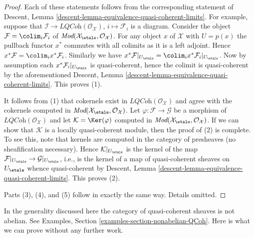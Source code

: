 \begin{proof}
Each of these statements follows from the corresponding statement of
Descent, Lemma \ref{descent-lemma-equivalence-quasi-coherent-limits}.
For example, suppose that
$\mathcal{I} \to \textit{LQCoh}(\mathcal{O}_\mathcal{X})$,
$i \mapsto \mathcal{F}_i$ is a diagram.
Consider the object $\mathcal{F} = \colim_i \mathcal{F}_i$ of
$\textit{Mod}(\mathcal{X}_\etale, \mathcal{O}_\mathcal{X})$.
For any object $x$ of $\mathcal{X}$ with $U = p(x)$ the pullback functor
$x^*$ commutes with all colimits as it is a left adjoint. Hence
$x^*\mathcal{F} = \colim_i x^*\mathcal{F}_i$. Similarly we have
$x^*\mathcal{F}|_{U_\etale} =
\colim_i x^*\mathcal{F}_i|_{U_\etale}$.
Now by assumption each $x^*\mathcal{F}_i|_{U_\etale}$
is quasi-coherent, hence the colimit is quasi-coherent by the
aforementioned
Descent, Lemma \ref{descent-lemma-equivalence-quasi-coherent-limits}.
This proves (1).

\medskip\noindent
It follows from (1) that cokernels exist in
$\textit{LQCoh}(\mathcal{O}_\mathcal{X})$ and agree with the cokernels computed
in $\textit{Mod}(\mathcal{X}_\etale, \mathcal{O}_\mathcal{X})$.
Let $\varphi : \mathcal{F} \to \mathcal{G}$ be a morphism of
$\textit{LQCoh}(\mathcal{O}_\mathcal{X})$ and let
$\mathcal{K} = \Ker(\varphi)$ computed in
$\textit{Mod}(\mathcal{X}_\etale, \mathcal{O}_\mathcal{X})$.
If we can show that $\mathcal{K}$ is a locally quasi-coherent module,
then the proof of (2) is complete. To see this, note that kernels
are computed in the category of presheaves (no sheafification necessary).
Hence $\mathcal{K}|_{U_\etale}$ is the kernel of the map
$\mathcal{F}|_{U_\etale} \to \mathcal{G}|_{U_\etale}$,
i.e., is the kernel of a map of quasi-coherent sheaves on $U_\etale$
whence quasi-coherent by
Descent, Lemma \ref{descent-lemma-equivalence-quasi-coherent-limits}.
This proves (2).

\medskip\noindent
Parts (3), (4), and (5) follow in exactly the same way. Details omitted.
\end{proof}

\noindent
In the generality discussed here the category of quasi-coherent sheaves
is not abelian. See Examples, Section \ref{examples-section-nonabelian-QCoh}.
Here is what we can prove without any further work.

